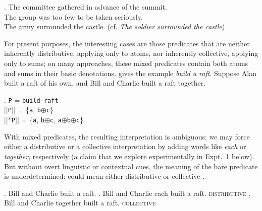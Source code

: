 \documentclass[linguex]{sp}
\newcommand{\sem}[1]{\mbox{$[\![$#1$]\!]$}}
\renewcommand{\tt}{\texttt}
\newcommand{\op}{$\oplus$}
\begin{document}
\ex. The committee gathered in advance of the summit.\\
The group was too few to be taken seriously.\\
The army surrounded the castle. (cf. \emph{The soldier surrounded the castle})


For present purposes, the interesting cases are those predicates that are neither inherently distributive, applying only to atoms, nor inherently collective, applying only to sums; on many approaches, these mixed predicates contain both atoms and sums in their basic denotations. \citeauthor{link1983} gives the example \emph{build a raft}. Suppose Alan built a raft of his own, and Bill and Charlie built a raft together.

\ex. \tt{P} = \tt{build-raft}\\
\sem{\tt{P}} = \{\tt{a}, \tt{b}\op\tt{c}\}\\
\sem{*\tt{P}} = \{\tt{a}, \tt{b}\op\tt{c}, \tt{a}\op\tt{b}\op\tt{c}\}

With mixed predicates, the resulting interpretation is ambiguous; we may force either a distributive or a collective interpretation by adding words like \emph{each} or \emph{together}, respectively (a claim that we explore experimentally in Expt.~1 below). But without overt linguistic or contextual cues, the meaning of the bare predicate is underdetermined: \Next could mean either distributive \Next[a] or collective \Next[b].


\ex. Bill and Charlie built a raft.
\a. Bill and Charlie each built a raft. \hfill \textsc{distributive}
\b. Bill and Charlie together built a raft. \hfill \textsc{collective}


%
%
%
%
%
%
\end{document}
